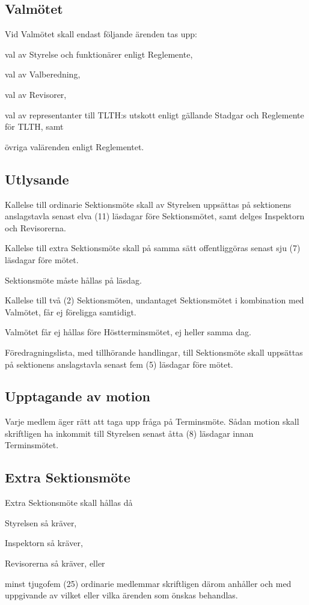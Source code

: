 \documentclass[10pt]{article}
\begin{document}
\subsection{Valmötet}
Vid Valmötet skall endast följande ärenden tas upp:
\begin{alphlist}
\item val av Styrelse och funktionärer enligt Reglemente,
\item val av Valberedning,
\item val av Revisorer,
\item val av representanter till TLTH:s utskott enligt gällande Stadgar och
    Reglemente för TLTH, samt
\item övriga valärenden enligt Reglementet.
\end{alphlist}

\subsection{Utlysande}
Kallelse till ordinarie Sektionsmöte skall av Styrelsen uppsättas på
sektionens anslagstavla senast elva (11) läsdagar före Sektionsmötet, samt
delges Inspektorn och Revisorerna.

Kallelse till extra Sektionsmöte skall på samma sätt offentliggöras senast
sju (7) läsdagar före mötet.

Sektionsmöte måste hållas på läsdag.

Kallelse till två (2) Sektionsmöten, undantaget Sektionsmötet i kombination
med Valmötet, får ej föreligga samtidigt.

Valmötet får ej hållas före Höstterminsmötet, ej heller samma dag.

Föredragningslista, med tillhörande handlingar, till Sektionsmöte skall
uppsättas på sektionens anslagstavla senast fem (5) läsdagar före mötet.

\subsection{Upptagande av motion}
Varje medlem äger rätt att taga upp fråga på Terminsmöte.
Sådan motion skall skriftligen ha inkommit till Styrelsen senast åtta (8)
läsdagar innan Terminsmötet.

\subsection{Extra Sektionsmöte}
Extra Sektionsmöte skall hållas då

\begin{alphlist}
\item Styrelsen så kräver,
\item Inspektorn så kräver,
\item Revisorerna så kräver, eller
\item minst tjugofem (25) ordinarie medlemmar skriftligen därom anhåller
    och med uppgivande av vilket eller vilka ärenden som önskas behandlas.
\end{alphlist}
\end{document}
